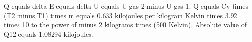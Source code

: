 Q equals delta E equals delta U equals U gas 2 minus U gas 1.  
Q equals Cv times (T2 minus T1) times m equals 0.633 kilojoules per kilogram Kelvin times 3.92 times 10 to the power of minus 2 kilograms times (500 Kelvin).  
Absolute value of Q12 equals 1.08294 kilojoules.